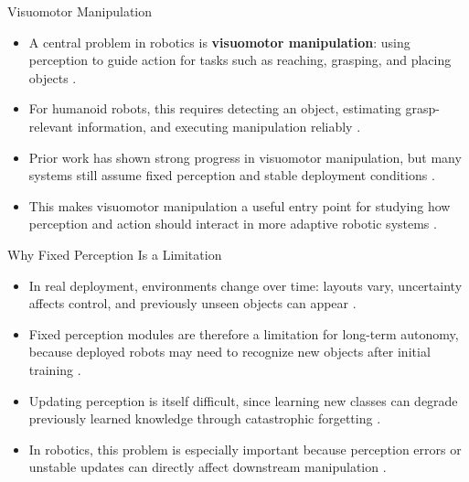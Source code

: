 \documentclass[12pt,aspectratio=169]{beamer}
\begin{document}
\begin{frame}{Visuomotor Manipulation}
\begin{itemize}
    \item A central problem in robotics is \textbf{visuomotor manipulation}: using perception to guide action for tasks such as reaching, grasping, and placing objects \cite{Shridhar2022CLIPort,Shridhar2023PerAct,Zheng2025EmbodiedManipSurvey}.
    \item For humanoid robots, this requires detecting an object, estimating grasp-relevant information, and executing manipulation reliably \cite{Zheng2025EmbodiedManipSurvey}.
    \item Prior work has shown strong progress in visuomotor manipulation, but many systems still assume fixed perception and stable deployment conditions \cite{Shridhar2022CLIPort,Shridhar2023PerAct,Brohan2022RT1,Ghosh2024Octo}.
    \item This makes visuomotor manipulation a useful entry point for studying how perception and action should interact in more adaptive robotic systems \cite{Zheng2025EmbodiedManipSurvey,Kasaei2021LifelongServiceRobots}.
\end{itemize}
\end{frame}

\begin{frame}{Why Fixed Perception Is a Limitation}
\begin{itemize}
    \item In real deployment, environments change over time: layouts vary, uncertainty affects control, and previously unseen objects can appear \cite{Kasaei2021LifelongServiceRobots,Zheng2025EmbodiedManipSurvey}.
    \item Fixed perception modules are therefore a limitation for long-term autonomy, because deployed robots may need to recognize new objects after initial training \cite{Kasaei2021LifelongServiceRobots,Zhou2024CILSurvey}.
    \item Updating perception is itself difficult, since learning new classes can degrade previously learned knowledge through catastrophic forgetting \cite{McCloskey1989Catastrophic,French1999Catastrophic,LiHoiem2016LwF}.
    \item In robotics, this problem is especially important because perception errors or unstable updates can directly affect downstream manipulation \cite{Kasaei2021LifelongServiceRobots,Meng2025RoboticLifelongRL,Zheng2025EmbodiedManipSurvey}.
\end{itemize}
\end{frame}
\end{document}
